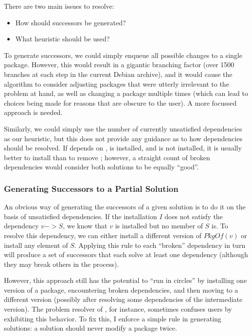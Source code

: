 \documentclass[letterpaper]{article}
\theoremstyle{definition}
\theoremstyle{remark}
\newcommand{\pkg}[1]{\text{\url{#1}}}
\newcommand{\pkgof}[1]{PkgOf(#1)}
\begin{document}
There are two main issues to resolve:

\begin{itemize}
\item How should successors be generated?
\item What heuristic should be used?
\end{itemize}

To generate successors, we could simply enqueue all possible changes
to a single package.  However, this would result in a gigantic
branching factor (over 1500 branches at each step in the current
Debian archive), and it would cause the algorithm to consider
adjusting packages that were utterly irrelevant to the problem at
hand, as well as changing a package multiple times (which can lead to
choices being made for reasons that are obscure to the user).  A more
focussed approach is needed.

Similarly, we could simply use the number of currently unsatisfied
dependencies as our heuristic, but this does not provide any guidance
as to how dependencies should be resolved.  If \pkg{A} depends on
\pkg{B}, \pkg{A} is installed, and \pkg{B} is not installed, it is
usually better to install \pkg{B} than to remove \pkg{A}; however, a
straight count of broken dependencies would consider both solutions to
be equally ``good''.

\subsubsection{Generating Successors to a Partial Solution}

An obvious way of generating the successors of a given solution is to
do it on the basis of unsatisfied dependencies.  If the installation
$I$ does not satisfy the dependency $v -> S$, we know that $v$ is
installed but no member of $S$ is.  To resolve this dependency, we can
either install a different version of $\pkgof{v}$ or install any
element of $S$.  Applying this rule to each ``broken'' dependency in
turn will produce a set of successors that each solve at least one
dependency (although they may break others in the process).

However, this approach still has the potential to ``run in circles''
by installing one version of a package, encountering broken
dependencies, and then moving to a different version (possibly after
resolving some dependencies of the intermediate version).  The problem
resolver of \pkg{apt}, for instance, sometimes confuses users by
exhibiting this behavior.  To fix this, I enforce a simple rule in
generating solutions: a solution should never modify a package twice.
\end{document}

